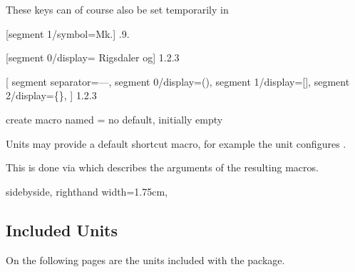 \documentclass{article}
\begin{document}
These keys can of course also be set temporarily in 

\begin{dispExample}
	[segment 1/symbol=Mk.]
	{.9.}

	[segment 0/display={}{ Rigsdaler og}]
	{1.2.3}

[
		segment separator={---},
		segment 0/display={(}{)},
		segment 1/display={[}{]},
		segment 2/display={\{}{\}},
	]
	{1.2.3}
\end{dispExample}

\begin{docKey}
	{create macro named}
	{=}
	{no default, initially empty}
	
	Units may provide a default shortcut macro, for example the  unit configures .
	
	This is done via  which describes the arguments of the resulting macros.

\begin{dispExample*}{
	sidebyside,
	righthand width=1.75cm,
}
\end{dispExample*}
\end{docKey}


\clearpage
\subsection{Included Units} %

\label{units:included}
On the following pages are the units included with the package.


\clearpage
{}


\printindex  %
\end{document}
